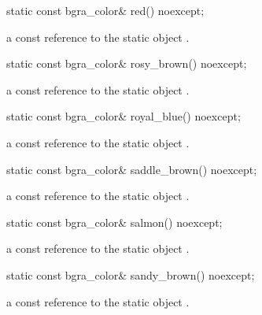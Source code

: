 \begin{itemdecl}
static const bgra_color& red() noexcept;
\end{itemdecl}
\begin{itemdescr}
\pnum
\returns
a const reference to the static  object .
\end{itemdescr}

\begin{itemdecl}
static const bgra_color& rosy_brown() noexcept;
\end{itemdecl}
\begin{itemdescr}
\pnum
\returns
a const reference to the static  object .
\end{itemdescr}

\begin{itemdecl}
static const bgra_color& royal_blue() noexcept;
\end{itemdecl}
\begin{itemdescr}
\pnum
\returns
a const reference to the static  object .
\end{itemdescr}

\begin{itemdecl}
static const bgra_color& saddle_brown() noexcept;
\end{itemdecl}
\begin{itemdescr}
\pnum
\returns
a const reference to the static  object .
\end{itemdescr}

\begin{itemdecl}
static const bgra_color& salmon() noexcept;
\end{itemdecl}
\begin{itemdescr}
\pnum
\returns
a const reference to the static  object .
\end{itemdescr}

\begin{itemdecl}
static const bgra_color& sandy_brown() noexcept;
\end{itemdecl}
\begin{itemdescr}
\pnum
\returns
a const reference to the static  object .
\end{itemdescr}

